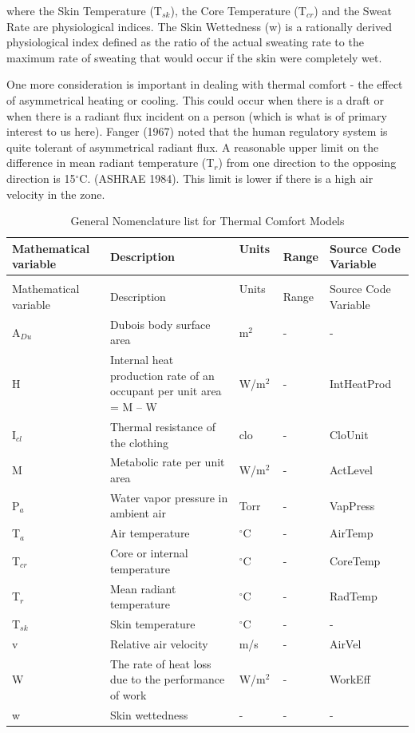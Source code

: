 where the Skin Temperature (T\(_{sk}\)), the Core Temperature (T\(_{cr}\)) and the Sweat Rate are physiological indices. The Skin Wettedness (w) is a rationally derived physiological index defined as the ratio of the actual sweating rate to the maximum rate of sweating that would occur if the skin were completely wet.

One more consideration is important in dealing with thermal comfort - the effect of asymmetrical heating or cooling. This could occur when there is a draft or when there is a radiant flux incident on a person (which is what is of primary interest to us here). Fanger (1967) noted that the human regulatory system is quite tolerant of asymmetrical radiant flux. A reasonable upper limit on the difference in mean radiant temperature (T\(_{r}\)) from one direction to the opposing direction is 15\(^{\circ}\)C. (ASHRAE 1984). This limit is lower if there is a high air velocity in the zone.

\begin{longtable}[c]{p{1.2in}p{2.0in}p{0.8in}p{0.8in}p{1.2in}}
\caption{General Nomenclature list for Thermal Comfort Models \label{table:general-nomenclature-list-for-thermal-comfort}} \tabularnewline
\toprule
Mathematical variable & Description & Units ~ & Range & Source Code Variable \tabularnewline
\midrule
\endfirsthead

\caption[]{General Nomenclature list for Thermal Comfort Models} \tabularnewline
\toprule
Mathematical variable & Description & Units ~ & Range & Source Code Variable \tabularnewline
\midrule
\endhead

A\(_{Du}\) & Dubois body surface area & m\(^{2}\) & - & - \tabularnewline
H & Internal heat production rate of an occupant per unit area = M – W & W/m\(^{2}\) & - & IntHeatProd \tabularnewline
I\(_{cl}\) & Thermal resistance of the clothing & clo & - & CloUnit \tabularnewline
M & Metabolic rate per unit area & W/m\(^{2}\) & - & ActLevel \tabularnewline
P\(_{a}\) & Water vapor pressure in ambient air & Torr & - & VapPress \tabularnewline
T\(_{a}\) & Air temperature & \(^{\circ}\)C & - & AirTemp \tabularnewline
T\(_{cr}\) & Core or internal temperature & \(^{\circ}\)C & - & CoreTemp \tabularnewline
T\(_{r}\) & Mean radiant temperature & \(^{\circ}\)C & - & RadTemp \tabularnewline
T\(_{sk}\) & Skin temperature & \(^{\circ}\)C & - & - \tabularnewline
v & Relative air velocity & m/s & - & AirVel \tabularnewline
W & The rate of heat loss due to the performance of work & W/m\(^{2}\) & - & WorkEff \tabularnewline
w & Skin wettedness & - & - & - \tabularnewline
\bottomrule
\end{longtable}

